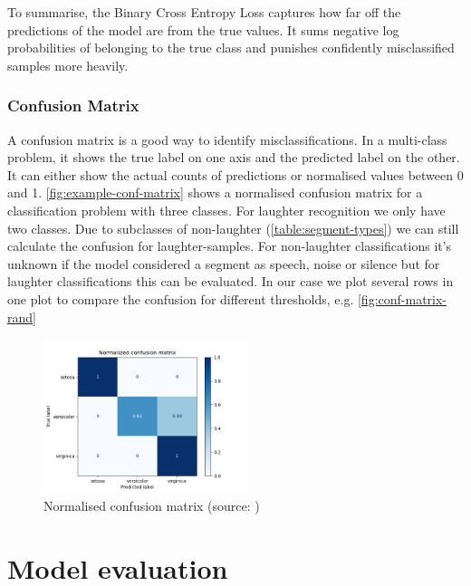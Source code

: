 \documentclass[bsc,frontabs,parskip,deptreport]{infthesis}
\begin{document}
To summarise, the Binary Cross Entropy Loss captures how far off the predictions of the model are from the true values. It sums negative log probabilities of belonging to the true class and punishes confidently misclassified samples more heavily.

\subsection{Confusion Matrix} \label{sec:conf-matrix}
A confusion matrix is a good way to identify misclassifications. In a multi-class problem, it shows the true label on one axis and the predicted label on the other. It can either show the actual counts of predictions or normalised values between 0 and 1. \autoref{fig:example-conf-matrix} shows a normalised confusion matrix for a classification problem with three classes.
For laughter recognition we only have two classes. Due to subclasses of non-laughter (\autoref{table:segment-types}) we can still calculate the confusion for laughter-samples. For non-laughter classifications it's unknown if the model considered a segment as speech, noise or silence but for laughter classifications this can be evaluated. In our case we plot several rows in one plot to compare the confusion for different thresholds, e.g. \autoref{fig:conf-matrix-rand}
\begin{figure}
    \centering
    \includegraphics[width=6cm]{imgs/examples/exmaple_confusion_matrix.png}
    \caption{Normalised confusion matrix (source: \citeauthor{confmatrixscikit})}
    \label{fig:example-conf-matrix}
\end{figure}

\chapter{Model evaluation} \label{cha:model-evaluation}
\end{document}
